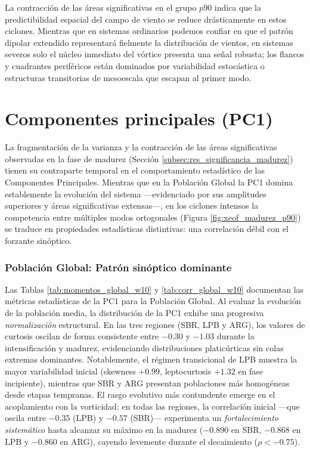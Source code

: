 La contracción de las áreas significativas en el grupo $p90$ indica que la predictibilidad espacial del campo de viento se reduce drásticamente en estos ciclones. 
Mientras que en sistemas ordinarios podemos confiar en que el patrón dipolar extendido representará fielmente la distribución de vientos, en sistemas severos solo el núcleo inmediato del vórtice presenta una señal robusta; los flancos y cuadrantes periféricos están dominados por variabilidad estocástica o estructuras transitorias de mesoescala que escapan al primer modo. 

\section{Componentes principales (PC1)}\label{subsec:res_dinamica_pc1}

La fragmentación de la varianza y la contracción de las áreas significativas observadas en la fase de madurez (Sección \ref{subsec:res_significancia_madurez}) tienen su contraparte temporal en el comportamiento estadístico de las Componentes Principales. 
Mientras que en la Población Global la PC1 domina establemente la evolución del sistema —evidenciado por sus amplitudes superiores y áreas significativas extensas—, en los ciclones intensos la competencia entre múltiples modos ortogonales (Figura \ref{fig:xeof_madurez_p90}) se traduce en propiedades estadísticas distintivas: una correlación débil con el forzante sinóptico.



\subsubsection{Población Global: Patrón sinóptico dominante}

Las Tablas \ref{tab:momentos_global_w10} y \ref{tab:corr_global_w10} documentan las métricas estadísticas de la PC1 para la Población Global. Al evaluar la evolución de la población media, la distribución de la PC1 exhibe una progresiva \textit{normalización} estructural. 
En las tres regiones (SBR, LPB y ARG), los valores de curtosis oscilan de forma consistente entre $-0.30$ y $-1.03$ durante la intensificación y madurez, evidenciando distribuciones platicúrticas sin colas extremas dominantes. 
Notablemente, el régimen transicional de LPB muestra la mayor variabilidad inicial (skewness $+0.99$, leptocurtosis $+1.32$ en fase incipiente), mientras que SBR y ARG presentan poblaciones más homogéneas desde etapas tempranas.
El rasgo evolutivo más contundente emerge en el acoplamiento con la vorticidad: en todas las regiones, la correlación inicial —que oscila entre $-0.35$ (LPB) y $-0.57$ (SBR)— experimenta un \textit{fortalecimiento sistemático} hasta alcanzar su máximo en la madurez ($-0.890$ en SBR, $-0.868$ en LPB y $-0.860$ en ARG), cayendo levemente durante el decaimiento ($\rho < -0.75$).

